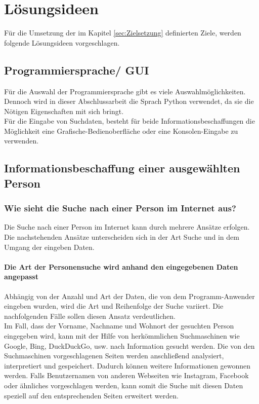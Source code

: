 
\chapter{Lösungsideen}  %
\label{cha:Lösungsideen} %
Für die Umsetzung der im Kapitel \ref{sec:Zielsetzung} definierten Ziele, werden folgende Lösungsideen vorgeschlagen.

\section{Programmiersprache/ GUI}
Für die Auswahl der Programmiersprache gibt es viele Auswahlmöglichkeiten. Dennoch wird in dieser Abschlussarbeit die Sprach Python verwendet, da sie die Nötigen Eigenschaften mit sich bringt.\\
Für die Eingabe von Suchdaten, besteht für beide Informationsbeschaffungen die Möglichkeit eine Grafische-Bedienoberfläche oder eine Konsolen-Eingabe zu verwenden.
\section{Informationsbeschaffung einer ausgewählten Person}	
	\subsection{Wie sieht die Suche nach einer Person im Internet aus?}
	\label{sec:Suche nach Information}
	Die Suche nach einer Person im Internet kann durch mehrere Ansätze erfolgen. Die nachstehenden Ansätze unterscheiden sich in der Art Suche und in dem Umgang der eingeben Daten.
		\subsubsection{Die Art der Personensuche wird anhand den eingegebenen Daten angepasst}
		\label{subsubsec: DieArtderPersonensuchewirdanhanddeneingegebenenDaten angepasst}
		Abhängig von der Anzahl und Art der Daten, die von dem Programm-Anwender eingeben wurden, wird die Art und Reihenfolge der Suche variiert. Die nachfolgenden Fälle sollen diesen Ansatz verdeutlichen.\\
		
		Im Fall, dass der Vorname, Nachname und Wohnort der gesuchten Person eingegeben wird, kann mit der Hilfe von herkömmlichen Suchmaschinen wie Google, Bing, DuckDuckGo, usw. nach Information gesucht werden. Die von den Suchmaschinen vorgeschlagenen Seiten werden anschließend analysiert, interpretiert und gespeichert. Dadurch können weitere Informationen gewonnen werden. Falls Benutzernamen von anderen Webseiten wie Instagram, Facebook oder ähnliches vorgeschlagen werden, kann somit die Suche mit diesen Daten speziell auf den entsprechenden Seiten erweitert werden.\\
		
